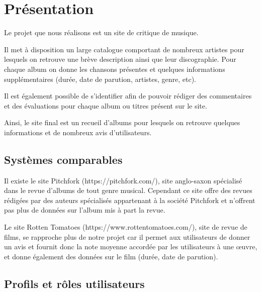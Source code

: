 \section{Présentation}

  \begin{paragraphe}
  	Le projet que nous réalisons est un site de critique de musique.\par
    Il met à disposition un large catalogue comportant de nombreux artistes
    pour lesquels on retrouve une brève description ainsi que leur discographie.
    Pour chaque album on donne les chansons présentes et quelques informations
    supplémentaires (durée, date de parution, artistes, genre, etc). \par
    Il est également possible de s’identifier afin de pouvoir rédiger des
    commentaires et des évaluations pour chaque album ou titres présent sur le site.
  \end{paragraphe}

  \begin{paragraphe}
    Ainsi, le site final est un recueil d’albums pour lesquels on retrouve
    quelques informations et de nombreux avis d’utilisateurs.
  \end{paragraphe}

  \subsection{Systèmes comparables}

  \begin{paragraphe}
    Il existe le site Pitchfork (https://pitchfork.com/), site anglo-saxon
    spécialisé dans le revue d’albums de tout genre musical. Cependant ce site
    offre des revues rédigées par des auteurs spécialisés appartenant à la
    société Pitchfork et n’offrent pas plus de données sur l’album mis à part
    la revue.\par
    Le site Rotten Tomatoes (https://www.rottentomatoes.com/), site de revue de
    films, se rapproche plus de notre projet car il permet aux utilisateurs de
    donner un avis et fournit donc la note moyenne accordée par les
    utilisateurs à une œuvre, et donne également des données sur le film
    (durée, date de parution).
  \end{paragraphe}

  \subsection{Profils et rôles utilisateurs}

